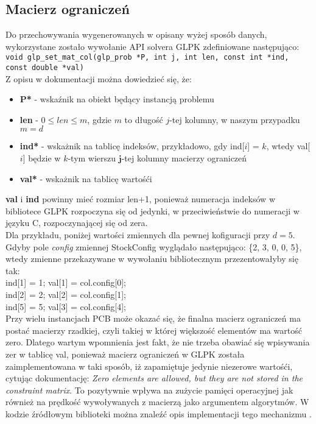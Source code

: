 \subsection{Macierz ograniczeń} \label{macierz_ograniczen}
Do przechowywania wygenerowanych w opisany wyżej sposób danych, wykorzystane zostało wywołanie API solvera GLPK zdefiniowane następująco: \\
\verb|void glp_set_mat_col(glp_prob *P, int j, int len, const int *ind, const double *val)| \\
Z opisu w dokumentacji \cite{GLPK_DOCS} można dowiedzieć się, że:
\begin{itemize}
	\item \textbf{P*} - wskaźnik na obiekt będący instancją problemu
	\item \textbf{len} - $0 \leq len \leq m$, gdzie $m$ to długość $j$-tej kolumny, w naszym przypadku $m = d$
	\item \textbf{ind*} - wskażnik na tablicę indeksów, przykładowo, gdy ind[$i$] = $k$, wtedy val[$i$] będzie w $k$-tym wierszu $\mathbf{j}$-tej kolumny macierzy ograniczeń
	\item \textbf{val*} - wskażnik na tablicę wartośći
\end{itemize}
\textbf{val} i \textbf{ind} powinny mieć rozmiar len+1, ponieważ numeracja indeksów w bibliotece GLPK rozpoczyna się od jedynki, w przeciwieństwie do numeracji w języku C, rozpoczynającej się od zera. \\

Dla przykładu, poniżej wartości zmiennych dla pewnej kofiguracji przy $d=5$. \\
Gdyby pole \textit{config} zmiennej StockConfig wyglądało następująco: \{2, 3, 0, 0, 5\}, wtedy zmienne przekazywane w wywołaniu bibliotecznym przezentowałyby się tak: \\
ind[1] = 1; val[1] = col.config[0]; \\
ind[2] = 2; val[2] = col.config[1]; \\
ind[5] = 5; val[3] = col.config[4]; \\

Przy wielu instancjach PCB może okazać się, że finalna macierz ograniczeń ma postać macierzy rzadkiej, czyli takiej w której większość elementów ma wartość zero. Dlatego wartym wpomnienia jest fakt, że nie trzeba obawiać się wpisywania zer w tablicę val, ponieważ macierz ograniczeń w GLPK została zaimplementowana w taki sposób, iż zapamiętuje jedynie niezerowe wartośći, cytując dokumentację: \textit{Zero elements are allowed, but they are not stored in the constraint matrix}. To pozytywnie wpływa na zużycie pamięci operacyjnej jak również na prędkość wywoływanych z macierzą jako argumentem algorytmów. W kodzie źródłowym biblioteki można znaleźć opis implementacji tego mechanizmu \cite{GLPK_SRC}.

